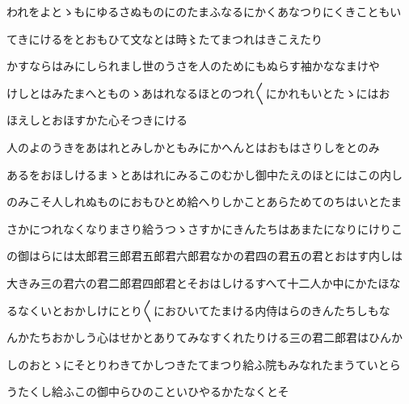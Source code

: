 \documentclass[a4paper,11pt,landscape]{ltjtarticle}
\begin{document}
われをよとゝもにゆるさぬものにのたまふなるにかくあなつりにくきこともい
\par\medskip
てきにけるをとおもひて文なとは時〻たてまつれはきこえたり
\par\medskip
かすならはみにしられまし世のうさを人のためにもぬらす袖かななまけや
\par\medskip
けしとはみたまへとものゝあはれなるほとのつれ〱にかれもいとたゝにはお
\par\medskip
ほえしとおほすかた心そつきにける
\par\medskip
人のよのうきをあはれとみしかともみにかへんとはおもはさりしをとのみ
\par\medskip
あるをおほしけるまゝとあはれにみるこのむかし御中たえのほとにはこの内し
\par\medskip
のみこそ人しれぬものにおもひとめ給へりしかことあらためてのちはいとたま
\par\medskip
さかにつれなくなりまさり給うつゝさすかにきんたちはあまたになりにけりこ
\par\medskip
の御はらには太郎君三郎君五郎君六郎君なかの君四の君五の君とおはす内しは
\par\medskip
大きみ三の君六の君二郎君四郎君とそおはしけるすへて十二人か中にかたほな
\par\medskip
るなくいとおかしけにとり〱におひいてたまける内侍はらのきんたちしもな
\par\medskip
んかたちおかしう心はせかとありてみなすくれたりける三の君二郎君はひんか
\par\medskip
しのおとゝにそとりわきてかしつきたてまつり給ふ院もみなれたまうていとら
\par\medskip
うたくし給ふこの御中らひのこといひやるかたなくとそ
\par\medskip
\end{document}

